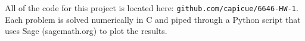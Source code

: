 \documentclass[10pt,letterpaper]{amspset}
\begin{document}
  
  All of the code for this project is located here: \texttt{github.com/capicue/6646-HW-1}. Each problem is solved numerically in C and piped through a Python script that uses Sage (sagemath.org) to plot the results.
  
  
    \FloatBarrier
  
    \FloatBarrier
  
    \FloatBarrier
  
    \FloatBarrier
  
    \FloatBarrier
  
\end{document}
